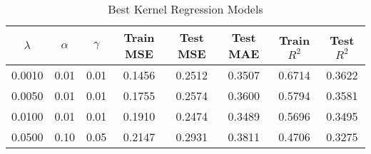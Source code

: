 \begin{table}[ht]\centering
    \caption{Best Kernel Regression Models}
    \label{tab:best_kernel_models}
    \begin{tabular}{cccccccc}
    \toprule
    \textbf{$\lambda$} & \textbf{$\alpha$} & \textbf{$\gamma$} & \textbf{Train MSE} & \textbf{Test MSE} & \textbf{Test MAE} & \textbf{Train $R^2$} & \textbf{Test $R^2$} \\
    \midrule
    0.0010 & 0.01 & 0.01 & 0.1456 & 0.2512 & 0.3507 & 0.6714 & 0.3622 \\
    0.0050 & 0.01 & 0.01 & 0.1755 & 0.2574 & 0.3600 & 0.5794 & 0.3581 \\
    0.0100 & 0.01 & 0.01 & 0.1910 & 0.2474 & 0.3489 & 0.5696 & 0.3495 \\
    0.0500 & 0.10 & 0.05 & 0.2147 & 0.2931 & 0.3811 & 0.4706 & 0.3275 \\
    \bottomrule
    \end{tabular}
\end{table}